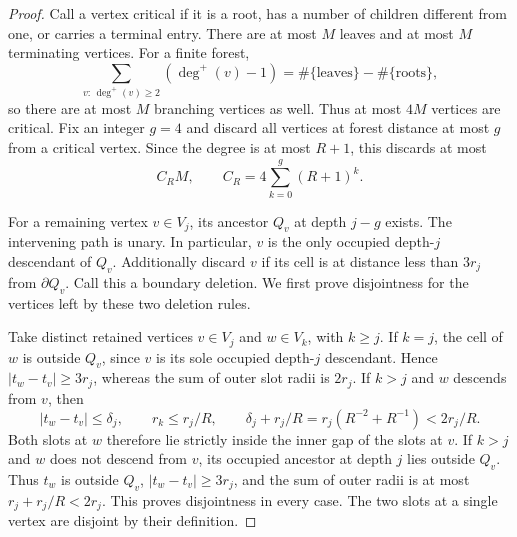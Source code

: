 \begin{proof}
Call a vertex critical if it is a root, has a number of children different
from one, or carries a terminal entry.  There are at most $M$ leaves and
at most $M$ terminating vertices.  For a finite forest,
\[
 \sum_{v:\,\deg^+(v)\geq2}(\deg^+(v)-1)
 =\#\{\text{leaves}\}-\#\{\text{roots}\},
\]
so there are at most $M$ branching vertices as well.  Thus at most $4M$
vertices are critical.  Fix an integer $g=4$ and discard all vertices at
forest distance at most $g$ from a critical vertex.  Since the degree is
at most $R+1$, this discards at most
\[
 C_RM,\qquad
 C_R=4\sum_{k=0}^g(R+1)^k.
\]

For a remaining vertex $v\in V_j$, its ancestor $Q_v$ at depth $j-g$
exists.  The intervening path is unary.  In particular, $v$ is the only
occupied depth-$j$ descendant of $Q_v$.  Additionally discard $v$ if
its cell is at distance less than $3r_j$ from $\partial Q_v$.
Call this a boundary deletion.  We first prove disjointness for the
vertices left by these two deletion rules.

Take distinct retained vertices $v\in V_j$ and $w\in V_k$, with
$k\geq j$.  If $k=j$, the cell of $w$ is outside $Q_v$, since $v$ is
its sole occupied depth-$j$ descendant.  Hence
$|t_w-t_v|\geq3r_j$, whereas the sum of outer slot radii is $2r_j$.
If $k>j$ and $w$ descends from $v$, then
\[
 |t_w-t_v|\leq\delta_j,\qquad r_k\leq r_j/R,
 \qquad
 \delta_j+r_j/R
 =r_j(R^{-2}+R^{-1})<2r_j/R.
\]
Both slots at $w$ therefore lie strictly inside the inner gap of the
slots at $v$.  If $k>j$ and $w$ does not descend from $v$, its occupied
ancestor at depth $j$ lies outside $Q_v$.  Thus $t_w$ is outside $Q_v$,
$|t_w-t_v|\geq3r_j$, and the sum of outer radii is at most
$r_j+r_j/R<2r_j$.  This proves disjointness in every case.  The two
slots at a single vertex are disjoint by their definition.


\end{proof}
